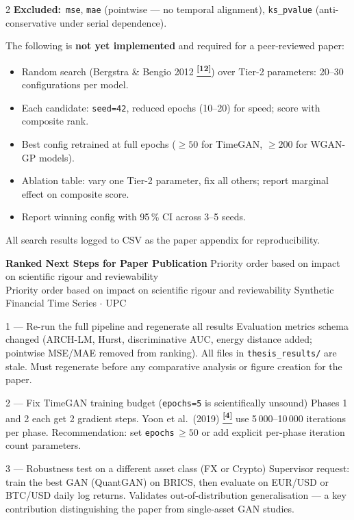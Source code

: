 \documentclass[10pt]{article}
\newcommand{\amberbox}[2]{\begin{tcolorbox}[mybox={Amber}{ABg},title={#1}]#2\end{tcolorbox}}
\newcommand{\pagehead}[2]{%
  \begin{tcolorbox}[enhanced,arc=0pt,outer arc=0pt,boxrule=0pt,
    colback=Navy,colframe=Navy,
    top=5pt,bottom=5pt,left=8pt,right=8pt,
    before skip=0pt,after skip=10pt]
  {\color{white}\large\bfseries #1}%
  \ifx\relax#2\relax\else\\[1pt]{\color{blue!30!white}\small #2}\fi
  \hfill{\color{blue!20!white}\footnotesize Synthetic Financial Time Series $\cdot$ UPC}
  \end{tcolorbox}}
\newcommand{\tcite}[1]{%
  \hyperlink{R:#1}{\textsuperscript{\scriptsize\textbf{[#1]}}}}
\begin{document}
\begin{multicols}{2}
{\smallskip
\textbf{Excluded:}\ \texttt{mse}, \texttt{mae} (pointwise --- no temporal alignment), \texttt{ks\_pvalue} (anti-conservative under serial dependence).}

\amberbox{TODO: Systematic Hyperparameter Search for Publication}{%
The following is \textbf{not yet implemented} and required for a peer-reviewed paper:
\begin{itemize}
  \item Random search (Bergstra \& Bengio 2012\tcite{12}) over Tier-2 parameters: 20--30 configurations per model.
  \item Each candidate: \texttt{seed=42}, reduced epochs (10--20) for speed; score with composite rank.
  \item Best config retrained at full epochs ($\geq 50$ for TimeGAN, $\geq 200$ for WGAN-GP models).
  \item Ablation table: vary one Tier-2 parameter, fix all others; report marginal effect on composite score.
  \item Report winning config with 95\,\% CI across 3--5 seeds.
\end{itemize}
All search results logged to CSV as the paper appendix for reproducibility.}

\end{multicols}

\clearpage

\pagehead{Ranked Next Steps for Paper Publication}
         {Priority order based on impact on scientific rigour and reviewability}

\vspace{4pt}
%
  {1 --- Re-run the full pipeline and regenerate all results}%
  {Evaluation metrics schema changed (ARCH-LM, Hurst, discriminative AUC, energy distance added; pointwise MSE/MAE removed from ranking). All files in \texttt{thesis\_results/} are stale. Must regenerate before any comparative analysis or figure creation for the paper.}

%
  {2 --- Fix TimeGAN training budget (\texttt{epochs=5} is scientifically unsound)}%
  {Phases 1 and 2 each get 2 gradient steps. Yoon et al.\ (2019)\tcite{4} use 5\,000--10\,000 iterations per phase. Recommendation: set \texttt{epochs}\,$\geq 50$ or add explicit per-phase iteration count parameters.}

%
  {3 --- Robustness test on a different asset class (FX or Crypto)}%
  {Supervisor request: train the best GAN (QuantGAN) on BRICS, then evaluate on EUR/USD or BTC/USD daily log returns. Validates out-of-distribution generalisation --- a key contribution distinguishing the paper from single-asset GAN studies.}
\end{document}
